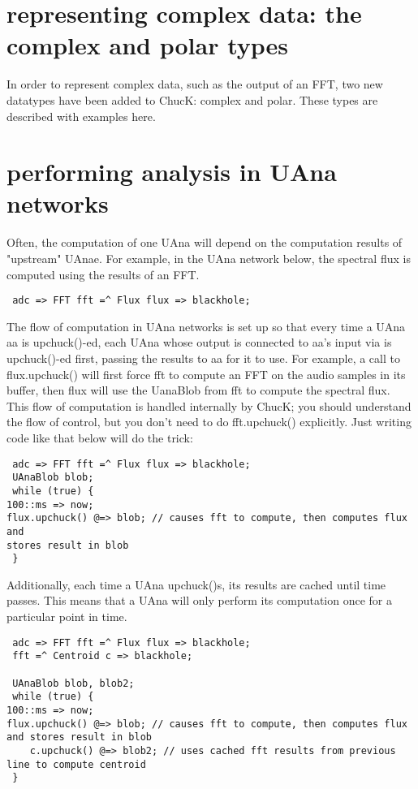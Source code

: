 \section{representing complex data: the complex and polar types} 

In order to represent complex data, such as the output of an FFT, two new
datatypes have been added to ChucK: complex and polar. These types are described
with examples here.

\section{performing analysis in UAna networks }

Often, the computation of one UAna will depend on the computation results of
"upstream" UAnae. For example, in the UAna network below, the spectral flux is
computed using the results of an FFT.

\begin{verbatim}
 adc => FFT fft =^ Flux flux => blackhole;
\end{verbatim}

The flow of computation in UAna networks is set up so that every time a UAna aa
is upchuck()-ed, each UAna whose output is connected to aa's input via \upchuckop
is upchuck()-ed first, passing the results to aa for it to use. For example, a
call to flux.upchuck() will first force fft to compute an FFT on the audio
samples in its buffer, then flux will use the UanaBlob from fft to compute the
spectral flux. This flow of computation is handled internally by ChucK; you
should understand the flow of control, but you don't need to do fft.upchuck()
explicitly. Just writing code like that below will do the trick:

\begin{verbatim}
 adc => FFT fft =^ Flux flux => blackhole;
 UAnaBlob blob;
 while (true) {
100::ms => now;
flux.upchuck() @=> blob; // causes fft to compute, then computes flux and
stores result in blob
 }
\end{verbatim}

Additionally, each time a UAna upchuck()s, its results are cached until time
passes. This means that a UAna will only perform its computation once for a
particular point in time.

\begin{verbatim}
 adc => FFT fft =^ Flux flux => blackhole;
 fft =^ Centroid c => blackhole;

 UAnaBlob blob, blob2;
 while (true) {
100::ms => now;
flux.upchuck() @=> blob; // causes fft to compute, then computes flux and stores result in blob
 	c.upchuck() @=> blob2; // uses cached fft results from previous line to compute centroid
 }
\end{verbatim}

